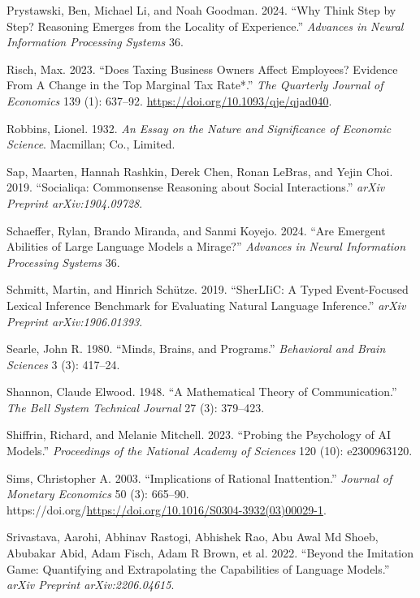 \documentclass[
]{article}
\newlength{\cslhangindent}
\newenvironment{CSLReferences}[2] %
 {\begin{list}{}{%
  \setlength{\itemindent}{0pt}
  \setlength{\leftmargin}{0pt}
  \setlength{\parsep}{0pt}
  \ifodd #1
   \setlength{\leftmargin}{\cslhangindent}
   \setlength{\itemindent}{-1\cslhangindent}
  \fi
  \setlength{\itemsep}{#2\baselineskip}}}
 {\end{list}}
\begin{document}
\begin{CSLReferences}{1}{0}
Prystawski, Ben, Michael Li, and Noah Goodman. 2024. {``Why Think Step
by Step? Reasoning Emerges from the Locality of Experience.''}
\emph{Advances in Neural Information Processing Systems} 36.

Risch, Max. 2023. {``{Does Taxing Business Owners Affect Employees?
Evidence From A Change in the Top Marginal Tax Rate*}.''} \emph{The
Quarterly Journal of Economics} 139 (1): 637--92.
\url{https://doi.org/10.1093/qje/qjad040}.

Robbins, Lionel. 1932. \emph{An Essay on the Nature and Significance of
Economic Science}. Macmillan; Co., Limited.

Sap, Maarten, Hannah Rashkin, Derek Chen, Ronan LeBras, and Yejin Choi.
2019. {``Socialiqa: Commonsense Reasoning about Social Interactions.''}
\emph{arXiv Preprint arXiv:1904.09728}.

Schaeffer, Rylan, Brando Miranda, and Sanmi Koyejo. 2024. {``Are
Emergent Abilities of Large Language Models a Mirage?''} \emph{Advances
in Neural Information Processing Systems} 36.

Schmitt, Martin, and Hinrich Schütze. 2019. {``SherLIiC: A Typed
Event-Focused Lexical Inference Benchmark for Evaluating Natural
Language Inference.''} \emph{arXiv Preprint arXiv:1906.01393}.

Searle, John R. 1980. {``Minds, Brains, and Programs.''}
\emph{Behavioral and Brain Sciences} 3 (3): 417--24.

Shannon, Claude Elwood. 1948. {``A Mathematical Theory of
Communication.''} \emph{The Bell System Technical Journal} 27 (3):
379--423.

Shiffrin, Richard, and Melanie Mitchell. 2023. {``Probing the Psychology
of AI Models.''} \emph{Proceedings of the National Academy of Sciences}
120 (10): e2300963120.

Sims, Christopher A. 2003. {``Implications of Rational Inattention.''}
\emph{Journal of Monetary Economics} 50 (3): 665--90.
https://doi.org/\url{https://doi.org/10.1016/S0304-3932(03)00029-1}.

Srivastava, Aarohi, Abhinav Rastogi, Abhishek Rao, Abu Awal Md Shoeb,
Abubakar Abid, Adam Fisch, Adam R Brown, et al. 2022. {``Beyond the
Imitation Game: Quantifying and Extrapolating the Capabilities of
Language Models.''} \emph{arXiv Preprint arXiv:2206.04615}.


\end{CSLReferences}
\end{document}
